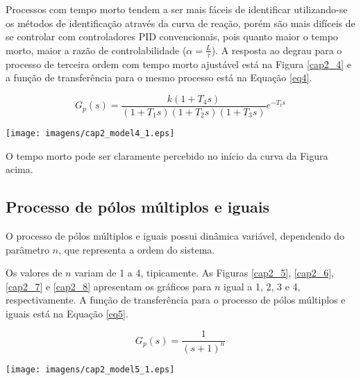     Processos com tempo morto tendem a ser mais fáceis de identificar utilizando-se
    os métodos de identificação através da curva de reação, porém são mais difíceis
    de se controlar com controladores \acs{PID} convencionais, pois quanto maior
    o tempo morto, maior a razão de controlabilidade ($\alpha = \frac{L}{\tau}$).
    A resposta ao degrau para o processo de terceira ordem com tempo morto ajustável
    está na Figura \ref{cap2_4} e a função de transferência para o mesmo processo
    está na Equação \ref{eq4}.
    
    \begin{equation}
        \label{eq4}
        G_p(s) = \frac{k(1+T_4 s)}{(1+T_1 s)(1+T_2 s)(1+T_3 s)} e^{-T_t s}
    \end{equation}
    
    \begin{center}
        \texttt{[image: imagens/cap2\_model4\_1.eps]}
        \label{cap2_4}
    \end{center}

    O tempo morto pode ser claramente percebido no início da curva da Figura acima.

\subsection{Processo de pólos múltiplos e iguais}

    O processo de pólos múltiplos e iguais possui dinâmica variável, dependendo
    do parâmetro $n$, que representa a ordem do sistema.
    
    Os valores de $n$ variam de 1 a 4, tipicamente. As Figuras \ref{cap2_5},
    \ref{cap2_6}, \ref{cap2_7} e \ref{cap2_8} apresentam os gráficos para
    $n$ igual a 1, 2, 3 e 4, respectivamente. A função de transferência para o
    processo de pólos múltiplos e iguais está na Equação \ref{eq5}.
    
    \begin{equation}
        \label{eq5}
        G_p(s) = \frac{1}{(s+1)^n}
    \end{equation}

    \begin{center}
        \texttt{[image: imagens/cap2\_model5\_1.eps]}
        \label{cap2_5}
    \end{center}
    
